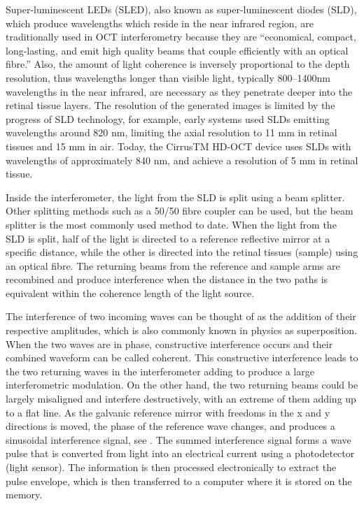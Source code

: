 Super-luminescent LEDs (SLED), also known as super-luminescent diodes (SLD),
which produce wavelengths which reside in the near infrared region, are
traditionally used in OCT interferometry because they are “economical,
compact, long-lasting, and emit high quality beams that couple efficiently
with an optical fibre.” \cite{mbib_6} Also, the amount of light coherence
is inversely proportional to the depth resolution, thus wavelengths longer
than visible light, typically 800–1400nm wavelengths in the near infrared,
are necessary as they penetrate deeper into the retinal tissue layers.\cite{mbib_4,mbib_7}
The resolution of the generated images is limited by the progress of SLD
technology, for example, early systems used SLDs emitting wavelengths around
820 nm, limiting the axial resolution to 11 mm in retinal tissues and 15 mm
in air. \cite{mbib_6}  Today, the CirrusTM HD-OCT device uses SLDs with wavelengths
of approximately 840 nm, and achieve a resolution of 5 mm in retinal tissue.\cite{mbib_7}

Inside the interferometer, the light from the SLD is split using a beam splitter.
Other splitting methods such as a 50/50 fibre coupler can be used, but the beam
splitter is the most commonly used method to date.  When the light from the SLD
is split, half of the light is directed to a reference reflective mirror at a
specific distance, while the other is directed into the retinal tissues (sample)
using an optical fibre.  The returning beams from the reference and sample arms
are recombined and produce interference when the distance in the two paths is
equivalent within the coherence length of the light source. \cite{mbib_5,mbib_6}

The interference of two incoming waves can be thought of as the addition of their
respective amplitudes, which is also commonly known in physics as superposition.
When the two waves are in phase, constructive interference occurs and their combined
waveform can be called coherent.  This constructive interference leads to the two
returning waves in the interferometer adding to produce a large interferometric
modulation.  On the other hand, the two returning beams could be largely misaligned
and interfere destructively, with an extreme of them adding up to a flat line.
As the galvanic reference mirror with freedoms in the x and y directions is moved,
the phase of the reference wave changes, and produces a sinusoidal interference
signal, see . The summed interference signal forms a wave pulse 
that is converted
from light into an electrical current using a photodetector (light sensor).\cite{mbib_6}
The information is then processed electronically to extract the pulse envelope, which
is then transferred to a computer where it is stored on the memory.\cite{mbib_6}

